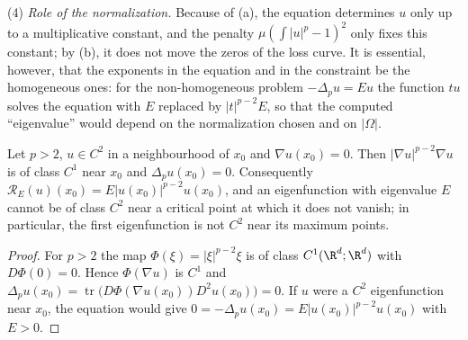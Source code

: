 \begin{remark}
(4) \emph{Role of the normalization.} Because of (a), the equation determines $u$ only up
to a multiplicative constant, and the penalty $\mu(\int|u|^p-1)^2$ only fixes this
constant; by (b), it does not move the zeros of the loss curve. It is essential, however,
that the exponents in the equation and in the constraint be the homogeneous ones: for
the non-homogeneous problem $-\Delta_pu=Eu$ the function $tu$ solves the equation with
$E$ replaced by $|t|^{p-2}E$, so that the computed ``eigenvalue'' would depend on the
normalization chosen and on $|\Omega|$.
\end{remark}

\begin{lemma}\label{lem.critical}
Let $p>2$, $u\in C^2$ in a neighbourhood of $x_0$ and $\nabla u(x_0)=0$. Then
$|\nabla u|^{p-2}\nabla u$ is of class $C^1$ near $x_0$ and $\Delta_pu(x_0)=0$.
Consequently $\mathcal R_E(u)(x_0)=E|u(x_0)|^{p-2}u(x_0)$, and an eigenfunction with
eigenvalue $E$ cannot be of class $C^2$ near a critical point at which it does not
vanish; in particular, the first eigenfunction is not $C^2$ near its maximum points.
\end{lemma}

\begin{proof}
For $p>2$ the map $\Phi(\xi)=|\xi|^{p-2}\xi$ is of class $C^1(\R^d;\R^d)$ with
$D\Phi(0)=0$. Hence $\Phi(\nabla u)$ is $C^1$ and
$\Delta_pu(x_0)=\operatorname{tr}\big(D\Phi(\nabla u(x_0))D^2u(x_0)\big)=0$. If $u$ were a
$C^2$ eigenfunction near $x_0$, the equation would give
$0=-\Delta_pu(x_0)=E|u(x_0)|^{p-2}u(x_0)$ with $E>0$.
\end{proof}


